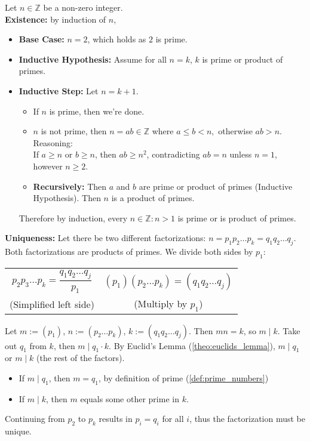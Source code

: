 \begin{Proof}

    Let $n\in\mathbb{Z}$ be a non-zero integer.\\

    \noindent
    \textbf{Existence:} by induction of $n$,
    \begin{itemize}
        \item \textbf{Base Case:} $n=2$, which holds as $2$ is prime.
        \item \textbf{Inductive Hypothesis:} Assume for all $n=k$, $k$ is prime or product of primes.
        \item \textbf{Inductive Step:} Let $n=k+1$. 
        \begin{itemize}
            \item If $n$ is prime, then we're done.
            \item $n$ is not prime, then $n=ab\in\mathbb{Z}$ where $a\leq b<n,$ otherwise $ab>n$. Reasoning:\\
                    If \( a \geq n \) or \( b \geq n \), then \( ab \geq n^2 \), contradicting \( ab = n \) unless \( n = 1 \), however \( n \geq 2 \).
            \item \textbf{Recursively:} Then $a$ and $b$ are prime or product of primes (Inductive Hypothesis). Then $n$ is a product of primes.
        \end{itemize}

        \noindent
        Therefore by induction, every $n\in\mathbb{Z}:n>1$ is prime or is product of primes.
    \end{itemize}
    
    \noindent
    \textbf{Uniqueness:} Let there be two different factorizations: $n = p_1p_2\ldots p_k= q_1q_2\ldots q_j$.\\
    Both factorizations are products of primes. We divide both sides by $p_1$:
    \begin{center}
        \begin{tabular}{cc}
            \(p_2p_3\ldots p_k = \dfrac{q_1q_2\ldots q_j}{p_1}\) &  \((p_1)(p_2\ldots p_k) = (q_1q_2\ldots q_j)\) \\
            (Simplified left side) & (Multiply by \(p_1\)) \\
       \end{tabular}
    \end{center}

    \noindent
    Let $m:=(p_1)$, $n:=(p_2\ldots p_k)$, $k:=(q_1q_2\ldots q_j)$. Then $mn=k$, so $m\mid k$. Take
    out $q_1$ from $k$, then $m\mid q_1\cdot k$. By Euclid's Lemma (\ref{theo:euclids_lemma}), $m\mid q_1$ or $m\mid k$ (the rest of the factors).
    \begin{itemize}
        \item If $m\mid q_1$, then $m=q_1$, by definition of prime (\ref{def:prime_numbers})
        \item If $m\mid k$, then $m$ equals some other prime in $k$.
    \end{itemize} 
    Continuing from $p_2$ to $p_k$ results in $p_i=q_i$ for all $i$, thus the factorization must be unique.
\end{Proof}

